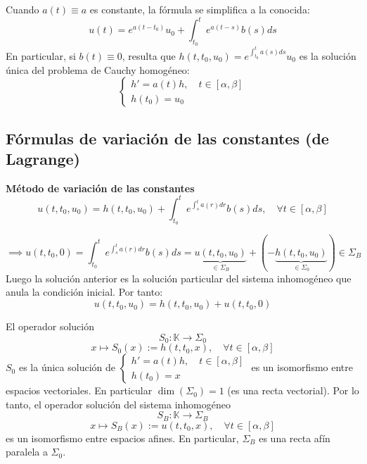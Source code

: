Cuando $a(t) \equiv a$ es constante, la fórmula se simplifica a la conocida:
\[
    u(t) = e^{a(t - t_0)} u_0 + \int_{t_0}^{t} e^{a(t - s)} b(s) ds
\]
En particular, si $b(t) \equiv 0$, resulta que $h(t,t_0,u_0) = e^{\int_{t_0}^{t} a(s) ds} u_0$ es la solución única del problema de Cauchy homogéneo:
\[
    \begin{cases}
    h' = a(t) h, \quad t \in [\alpha, \beta] \\
    h(t_0) = u_0
    \end{cases}
\]

\subsection{Fórmulas de variación de las constantes (de Lagrange)}

\textbf{Método de variación de las constantes}\\

\[
    u(t,t_0,u_0) = h(t,t_0,u_0) + \int_{t_0}^{t} e^{\int_{s}^{t} a(r) dr} b(s) ds, \quad \forall t \in [\alpha, \beta]
\]

\[
    \implies u(t,t_0,0) = \int_{t_0}^{t} e^{\int_{s}^{t} a(r) dr} b(s) ds = \underbrace{u(t,t_0,u_0)}_{\in \Sigma_B} + (- \underbrace{h(t,t_0,u_0)}_{\in \Sigma_0}) \in \Sigma_B 
\]
Luego la solución anterior es la solución particular del sistema inhomogéneo que anula la condición inicial. Por tanto:
\[
    u(t,t_0,u_0) = h(t,t_0,u_0) + u(t,t_0,0)
\]

\begin{teorema}
    El operador solución
    \[
        S_0 : \mathbb{K} \to \Sigma_0
    \]
    \[
        x \mapsto S_0(x) := h(t,t_0,x), \quad \forall t \in [\alpha, \beta]
    \]
    $S_0$ es la única solución de $\begin{cases}
        h' = a(t) h, \quad t \in [\alpha, \beta] \\
        h(t_0) = x
    \end{cases}$ es un isomorfismo entre espacios vectoriales. En particular $\dim(\Sigma_0) = 1$ (es una recta vectorial). Por lo tanto, el operador solución del sistema inhomogéneo
    \[
        S_B : \mathbb{K} \to \Sigma_B
    \]
    \[
        x \mapsto S_B(x) := u(t,t_0,x), \quad \forall t \in [\alpha, \beta]
    \]
    es un isomorfismo entre espacios afines. En particular, $\Sigma_B$ es una recta afín paralela a $\Sigma_0$.

\end{teorema}


